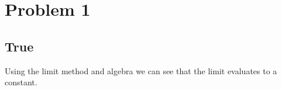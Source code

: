 \documentclass[11pt]{article}
\author{Josh Mayer}
\begin{document}
\section{Problem 1}

\subsection{True}

Using the limit method and algebra we
can see that the limit evaluates to a constant.
\end{document}

